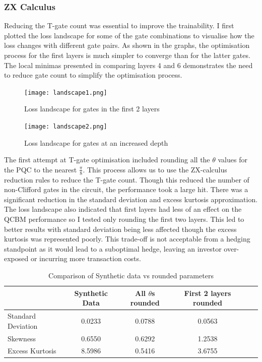 \documentclass[12pt]{article}
\numberwithin{equation}{section}
\begin{document}
\subsubsection{ZX Calculus}
Reducing the T-gate count was essential to improve the trainability. 
I first plotted the loss landscape for some of the gate combinations to visualise 
how the loss changes with different gate pairs. As shown in the graphs, the 
optimisation process for the first layers is much simpler to converge than for 
the latter gates. The local minimas presented in comparing layers 4 and 6 
demonstrates the need to reduce gate count to simplify the optimisation process. 
\begin{figure}[h!]
    \centering
    \begin{minipage}{0.48\textwidth}
        \centering
        \texttt{[image: landscape1.png]}
        \caption{Loss landscape for gates in the first 2 layers}
        \label{fig:landscape1}
    \end{minipage}
    \hfill
    \begin{minipage}{0.48\textwidth}
        \centering
        \texttt{[image: landscape2.png]}
        \caption{Loss landscape for gates at an increased depth}
        \label{fig:landscape2}
    \end{minipage}
\end{figure}
The first attempt at T-gate optimisation included rounding all the $\theta$ values 
for the PQC to the nearest $\frac{\pi}{8}$. This process allows us to use the 
ZX-calculus reduction rules to reduce the T-gate count. Though this reduced the 
number of non-Clifford gates in the circuit, the performance took a large hit. 
There was a significant reduction in the standard deviation and excess kurtosis
approximation. The loss landscape also indicated that first layers had less of an 
effect on the QCBM performance so I tested only rounding the first two layers. 
This led to better results with standard deviation being less affected though the 
excess kurtosis was represented poorly. This trade-off is not acceptable from a 
hedging standpoint as it would lead to a suboptimal hedge, leaving an investor 
over-exposed or incurring more transaction costs.  
\begin{table}[h!]
\centering
\begin{tabular}{lccccc}
\hline
\textbf{} & \textbf{Synthetic Data} & \textbf{All $\theta$s rounded } & \textbf{First 2 layers rounded} \\
\hline 
Standard Deviation & 0.0233 &0.0788 & 0.0563   \\
Skewness            & 0.6550 &0.6292 & 1.2538  \\
Excess Kurtosis     & 8.5986 &0.5416 & 3.6755   \\
\hline
\end{tabular}
\caption{Comparison of Synthetic data vs rounded parameters}
\label{tab:roundedtopi}
\end{table}
\end{document}
